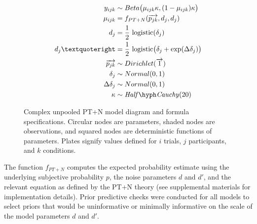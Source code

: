 \documentclass[
  english,
  man,floatsintext]{apa6}
\begin{document}
\begin{figure}
  \begin{minipage}{.5\textwidth}
    \flushright
    
  \end{minipage}%
  \begin{minipage}{.5\textwidth}
    \flushleft
    \small
    \begin{align*}
      y_{ijk} &\sim Beta\big(\mu_{ijk} \kappa, (1-\mu_{ijk}) \kappa \big) \\
      \mu_{ijk} &= f_{PT+N}(\overrightarrow{p_{jk}}, d_j, d_j)  \\
      d_j &= \frac{1}{2} \ \text{logistic}(\delta_j) \\
      d_j’ &= \frac{1}{2} \ \text{logistic}\big(\delta_j + \exp(\Delta\delta_j)\big) \\
      \overrightarrow{p_{jk}} &\sim Dirichlet(\overrightarrow{1}) \\
      \delta_j &\sim Normal(0,1) \\
      \Delta\delta_j &\sim Normal(0,1) \\
      \kappa &\sim \mathit{Half \hyph Cauchy}(20)
    \end{align*}
  \end{minipage}
  \caption{Complex unpooled PT+N model diagram and formula specifications. Circular nodes are parameters, shaded nodes are observations, and squared nodes are deterministic functions of parameters. Plates signify values defined for $i$ trials, $j$ participants, and $k$ conditions.}
\end{figure}

The function \(f_{PT+N}\) computes the expected probability estimate using the underlying subjective probability \(p\), the noise parameters \(d\) and \(d'\), and the relevant equation as defined by the PT+N theory (see supplemental materials for implementation details). Prior predictive checks were conducted for all models to select priors that would be uninformative or minimally informative on the scale of the model parameters \(d\) and \(d'\).
\end{document}
